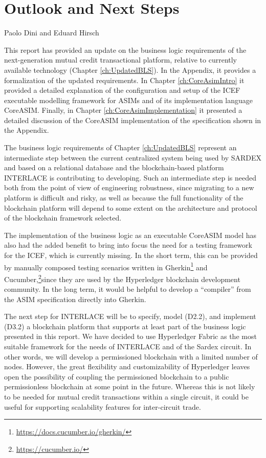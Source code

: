 \chapter{Outlook and Next Steps}
\label{ch:Outlook}

\vspace{-1cm}
\begin{center}
Paolo Dini and Eduard Hirsch
\end{center}

This report has provided an update on the business logic requirements of the next-generation mutual credit transactional platform, relative to currently available technology (Chapter \ref{ch:UpdatedBLS}). In the Appendix, it provides a formalization of the updated requirements. In Chapter \ref{ch:CoreAsimIntro} it  provided a detailed explanation of the configuration and setup of the ICEF executable modelling framework for ASIMs and of its implementation language CoreASIM. Finally, in Chapter \ref{ch:CoreAsimImplementation} it presented a detailed discussion of the CoreASIM implementation of the specification shown in the Appendix.

The business logic requirements of Chapter \ref{ch:UpdatedBLS} represent an intermediate step between the current centralized system being used by SARDEX and based on a relational database and the blockchain-based platform INTERLACE is contributing to developing. Such an intermediate step is needed both from the point of view of engineering robustness, since migrating to a new platform is difficult and risky, as well as because the full functionality of the blockchain platform will depend to some extent on the architecture and protocol of the blockchain framework selected.

The implementation of the business logic as an executable CoreASIM model has also had the added benefit to bring into focus the need for a testing framework for the ICEF, which is currently missing. In the short term, this can be provided by manually composed testing scenarios written in Gherkin\footnote{\url{https://docs.cucumber.io/gherkin/}} and Cucumber,\footnote{\url{https://cucumber.io/}}since they are used by the Hyperledger blockchain development community. In the long term, it would be helpful to develop a ``compiler'' from the ASIM specification directly into Gherkin.

The next step for INTERLACE will be to specify, model (D2.2), and implement (D3.2) a blockchain platform that supports at least part of the business logic presented in this report. We have decided to use Hyperledger Fabric as the most suitable framework for the needs of INTERLACE and of the Sardex circuit. In other words, we will develop a permissioned blockchain with a limited number of nodes. However, the great flexibility and customizability of Hyperledger leaves open the possibility of coupling the permissioned blockchain to a public permissionless blockchain at some point in the future. Whereas this is not likely to be needed for mutual credit transactions within a single circuit, it could be useful for supporting scalability features for inter-circuit trade.










